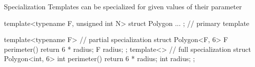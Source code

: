\begin{frame}[fragile]
  \begin{block}{Specialization}
    Templates can be specialized for given values of their parameter
  \end{block}
  \small
  \begin{cppcode*}{}
    template<typename F, unsigned int N>
    struct Polygon { ... }; // primary template

    template<typename F> // partial specialization
    struct Polygon<F, 6> {
      F perimeter() { return 6 * radius; }
      F radius;
    };
    template<>           // full specialization
    struct Polygon<int, 6> {
      int perimeter() { return 6 * radius; }
      int radius;
    };
  \end{cppcode*}
\end{frame}

